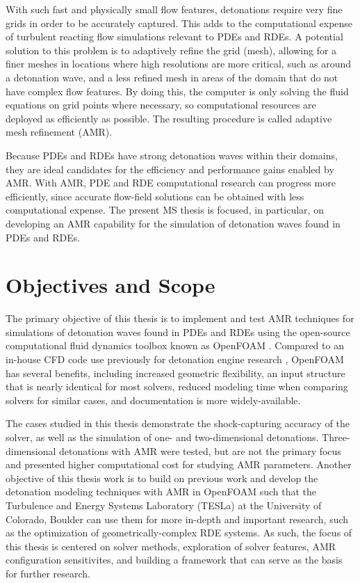 With such fast and physically small flow features, detonations require very fine grids in order to be accurately captured. This adds to the computational expense of turbulent reacting flow simulations relevant to PDEs and RDEs. A potential solution to this problem is to adaptively refine the grid (mesh), allowing for a finer meshes in locations where high resolutions are more critical, such as around a detonation wave, and a less refined mesh in areas of the domain that do not have complex flow features. By doing this, the computer is only solving the fluid equations on grid points where necessary, so computational resources are deployed as efficiently as possible. The resulting procedure is called adaptive mesh refinement (AMR). 

Because PDEs and RDEs have strong detonation waves within their domains, they are ideal candidates for the efficiency and performance gains enabled by AMR. With AMR, PDE and RDE computational research can progress more efficiently, since accurate flow-field solutions can be obtained with less computational expense. The present MS thesis is focused, in particular, on developing an AMR capability for the simulation of detonation waves found in PDEs and RDEs.

\section{Objectives and Scope}
The primary objective of this thesis is to implement and test AMR techniques for simulations of detonation waves found in PDEs and RDEs using the open-source computational fluid dynamics toolbox known as OpenFOAM \cite{weller}. Compared to an in-house CFD code use previously for detonation engine research \cite{towery1}, OpenFOAM has several benefits, including increased geometric flexibility, an input structure that is nearly identical for most solvers, reduced modeling time when comparing solvers for similar cases, and documentation is more widely-available.

The cases studied in this thesis demonstrate the shock-capturing accuracy of the solver, as well as the simulation of one- and two-dimensional detonations. Three-dimensional detonations with AMR were tested, but are not the primary focus and presented higher computational cost for studying AMR parameters. Another objective of this thesis work is to build on previous work \cite{towery1} and develop the detonation modeling techniques with AMR in OpenFOAM such that the Turbulence and Energy Systems Laboratory (TESLa) at the University of Colorado, Boulder can use them for more in-depth and important research, such as the optimization of geometrically-complex RDE systems. As such, the focus of this thesis is centered on solver methods, exploration of solver features, AMR configuration sensitivites, and building a framework that can serve as the basis for further research. 


